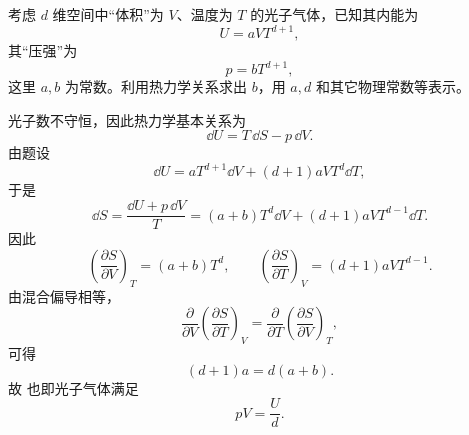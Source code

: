 \begin{question}
考虑 $d$ 维空间中“体积”为 $V$、温度为 $T$ 的光子气体，已知其内能为
\[
U=aVT^{d+1},
\]
其“压强”为
\[
p=bT^{d+1},
\]
这里 $a,b$ 为常数。利用热力学关系求出 $b$，用 $a,d$ 和其它物理常数等表示。

\begin{solution}
光子数不守恒，因此热力学基本关系为
\[
\dd{U}=T\,\dd{S}-p\,\dd{V}.
\]
由题设
\[
\dd{U}=aT^{d+1}\dd{V}+(d+1)aVT^d \dd{T},
\]
于是
\[
\dd{S}=\frac{\dd{U}+p\,\dd{V}}{T}=(a+b)T^d \dd{V}+(d+1)aVT^{d-1}\dd{T}.
\]
因此
\[
\left(\frac{\partial S}{\partial V}\right)_T=(a+b)T^d,
\qquad
\left(\frac{\partial S}{\partial T}\right)_V=(d+1)aVT^{d-1}.
\]
由混合偏导相等，
\[
\frac{\partial}{\partial V}\left(\frac{\partial S}{\partial T}\right)_V
=
\frac{\partial}{\partial T}\left(\frac{\partial S}{\partial V}\right)_T,
\]
可得
\[
(d+1)a=d(a+b).
\]
故
也即光子气体满足
\[
pV=\frac{U}{d}.
\]
\end{solution}
\end{question}

